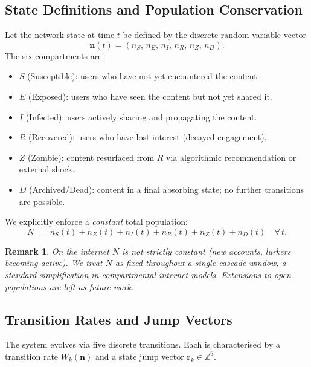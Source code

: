 \documentclass[11pt]{article}
\newtheorem{remark}{Remark}
\newcommand{\bn}{\mathbf{n}}
\newcommand{\br}{\mathbf{r}}
\begin{document}
\subsection{State Definitions and Population Conservation}

Let the network state at time $t$ be defined by the discrete random variable
vector
\[
  \bn(t) = (n_S,\, n_E,\, n_I,\, n_R,\, n_Z,\, n_D).
\]
The six compartments are:
\begin{itemize}[noitemsep]
  \item $S$ (Susceptible): users who have not yet encountered the content.
  \item $E$ (Exposed): users who have seen the content but not yet shared it.
  \item $I$ (Infected): users actively sharing and propagating the content.
  \item $R$ (Recovered): users who have lost interest (decayed engagement).
  \item $Z$ (Zombie): content resurfaced from $R$ via algorithmic recommendation
        or external shock.
  \item $D$ (Archived/Dead): content in a final absorbing state; no further
        transitions are possible.
\end{itemize}
We explicitly enforce a \emph{constant} total population:
\begin{equation}
  N \;=\; n_S(t) + n_E(t) + n_I(t) + n_R(t) + n_Z(t) + n_D(t)
  \quad \forall\, t.
  \label{eq:conservation}
\end{equation}

\begin{remark}
On the internet $N$ is not strictly constant (new accounts, lurkers becoming
active). We treat $N$ as fixed throughout a single cascade window, a standard
simplification in compartmental internet models. Extensions to open populations
are left as future work.
\end{remark}

\subsection{Transition Rates and Jump Vectors}
\label{sec:transitions}

The system evolves via five discrete transitions. Each is characterised by a
transition rate $W_k(\bn)$ and a state jump vector $\br_k \in \mathbb{Z}^6$.
\end{document}
